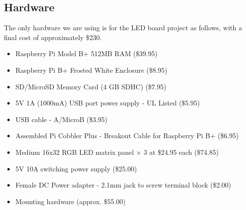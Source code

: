 \documentclass[12pt]{article}
\begin{document}
\subsection{Hardware}
The only hardware we are using is for the LED board project as follows, with a final cost of approximately \$230.
\begin{itemize}
\item Raspberry Pi Model B+ 512MB RAM (\$39.95)
\item Raspberry Pi B+ Frosted White Enclosure (\$8.95)
\item SD/MicroSD Memory Card (4 GB SDHC) (\$7.95)
\item 5V 1A (1000mA) USB port power supply - UL Listed (\$5.95)
\item USB cable - A/MicroB (\$3.95)
\item Assembled Pi Cobbler Plus - Breakout Cable for Raspberry Pi B+ (\$6.95)
\item Medium 16x32 RGB LED matrix panel × 3 at \$24.95 each (\$74.85)
\item 5V 10A switching power supply (\$25.00)
\item Female DC Power adapter - 2.1mm jack to screw terminal block (\$2.00)
\item Mounting hardware (approx. \$55.00)
\end{itemize}
\end{document}
